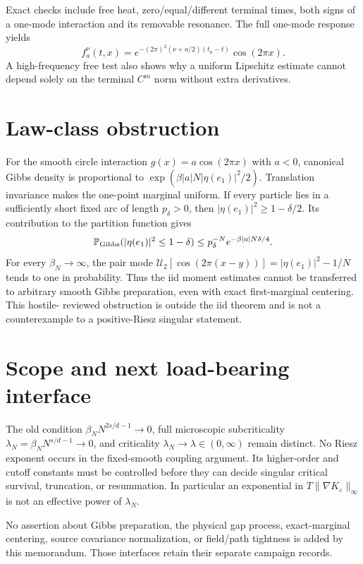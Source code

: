 \documentclass[11pt]{article}
\newcommand{\U}{\mathcal U}
\begin{document}
Exact checks include free heat, zero/equal/different terminal times, both
signs of a one-mode interaction and its removable resonance. The full
one-mode response yields
\[ f_a^\nu(t,x)=e^{-(2\pi)^2(\nu+a/2)(t_a-t)}\cos(2\pi x). \]
A high-frequency free test also shows why a uniform Lipschitz estimate cannot
depend solely on the terminal $C^m$ norm without extra derivatives.

\section{Law-class obstruction}
For the smooth circle interaction $g(x)=a\cos(2\pi x)$ with $a<0$, canonical
Gibbs density is proportional to
$\exp(\beta |a|N|\eta(e_1)|^2/2)$. Translation invariance makes the one-point
marginal uniform. If every particle lies in a sufficiently short fixed arc
of length $p_\delta>0$, then $|\eta(e_1)|^2\ge1-\delta/2$. Its contribution
to the partition function gives
\[
 \mathbb P_{\rm Gibbs}(|\eta(e_1)|^2\le1-\delta)
 \le p_\delta^{-N}e^{-\beta|a|N\delta/4}.
\]
For every $\beta_N\to\infty$, the pair mode
$\U_2[\cos(2\pi(x-y))]=|\eta(e_1)|^2-1/N$ tends to one in probability.
Thus the iid moment estimates cannot be transferred to arbitrary smooth
Gibbs preparation, even with exact first-marginal centering. This hostile-
reviewed obstruction is outside the iid theorem and is not a counterexample
to a positive-Riesz singular statement.





\section{Scope and next load-bearing interface}
The old condition $\beta_NN^{2s/d-1}\to0$, full microscopic subcriticality
$\lambda_N=\beta_NN^{s/d-1}\to0$, and criticality
$\lambda_N\to\lambda\in(0,\infty)$ remain distinct. No Riesz exponent occurs
in the fixed-smooth coupling argument. Its higher-order and cutoff constants
must be controlled before they can decide singular critical survival,
truncation, or resummation. In particular an exponential in
$T\|\nabla K_\varepsilon\|_\infty$ is not an effective power of $\lambda_N$.

No assertion about Gibbs preparation, the physical gap process, exact-marginal
centering, source covariance normalization, or field/path tightness is added
by this memorandum. Those interfaces retain their separate campaign records.
\end{document}
